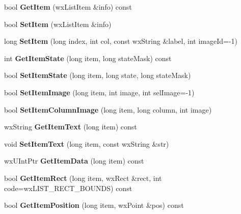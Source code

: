 \begin{DoxyCompactItemize}
\item 
bool {\bfseries GetItem} (wxListItem \&info) const \label{classMuleExtern_1_1wxGenericListCtrl_aa4ffdb3739634d5bb6985911793c0f50}

\item 
bool {\bfseries SetItem} (wxListItem \&info)\label{classMuleExtern_1_1wxGenericListCtrl_a0687f67cf23c59a77597b6bc4f8c0b1a}

\item 
long {\bfseries SetItem} (long index, int col, const wxString \&label, int imageId=-\/1)\label{classMuleExtern_1_1wxGenericListCtrl_a81989ab8b6351649e851fde4ee05824f}

\item 
int {\bfseries GetItemState} (long item, long stateMask) const \label{classMuleExtern_1_1wxGenericListCtrl_abb65977c839247b3866ec8b5dd1cf3ee}

\item 
bool {\bfseries SetItemState} (long item, long state, long stateMask)\label{classMuleExtern_1_1wxGenericListCtrl_a1e5058f213adbbadf09348d0badd21ca}

\item 
bool {\bfseries SetItemImage} (long item, int image, int selImage=-\/1)\label{classMuleExtern_1_1wxGenericListCtrl_a61cffef9d5bf45405cdfaa3de5848731}

\item 
bool {\bfseries SetItemColumnImage} (long item, long column, int image)\label{classMuleExtern_1_1wxGenericListCtrl_ad88b589065043f98cb8bd9cbdb739ef4}

\item 
wxString {\bfseries GetItemText} (long item) const \label{classMuleExtern_1_1wxGenericListCtrl_ad46fc560a61b0c2de48a4d3daaf2c3d7}

\item 
void {\bfseries SetItemText} (long item, const wxString \&str)\label{classMuleExtern_1_1wxGenericListCtrl_a93decd438aaf9bb63d26bcd0bcc77a1a}

\item 
wxUIntPtr {\bfseries GetItemData} (long item) const \label{classMuleExtern_1_1wxGenericListCtrl_ad090f93be0e58ec62cc0bb41476ea7d1}

\item 
bool {\bfseries GetItemRect} (long item, wxRect \&rect, int code=wxLIST\_\-RECT\_\-BOUNDS) const \label{classMuleExtern_1_1wxGenericListCtrl_a8237c85d2c8f6ab68531194e459e9dd0}

\item 
bool {\bfseries GetItemPosition} (long item, wxPoint \&pos) const \label{classMuleExtern_1_1wxGenericListCtrl_ae14d3192ec467a073c7eb4e656b78518}


\end{DoxyCompactItemize}
